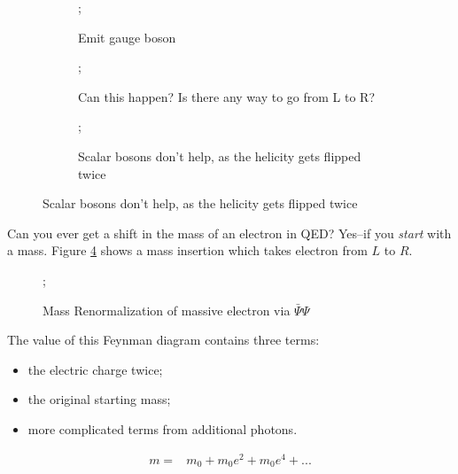 \documentclass[]{article}
\begin{document}
\begin{figure}[H]
		\caption{Electron emits and absorbs boson}\label{fig:emit:absorb:photon}
		\begin{subfigure}[t]{0.3\textwidth}
			\caption{Emit gauge boson}
			;
		\end{subfigure}
		\begin{subfigure}[t]{0.3\textwidth}
			\caption{Can this happen? Is there any way to go from L to R?}\label{fig:can:this:happen}
			;
		\end{subfigure}
		\begin{subfigure}[t]{0.3\textwidth}
			\caption{Scalar bosons don't help, as the helicity gets flipped twice}\label{fig:higgs:doesnt:help}
			;
		\end{subfigure}
	\end{figure}

Can you ever get a shift in the mass of an electron in QED? Yes--if you \emph{start} with a mass. Figure \ref{fig:renormalization:massive:electron} shows a mass insertion which takes electron from $L$ to $R$. 
 
\begin{figure}[H]
	\caption{Mass Renormalization of massive electron via $ \bar{\Psi} \Psi$}\label{fig:renormalization:massive:electron}
	;
\end{figure}

The value of this Feynman diagram contains three terms:
\begin{itemize}
	\item the electric charge twice;
	\item the original starting mass;
	\item more complicated terms from additional photons.
\end{itemize}

\begin{align*}
	m =& m_0 + m_0 e^2 + m_0 e^4 +...
\end{align*}
\end{document}
